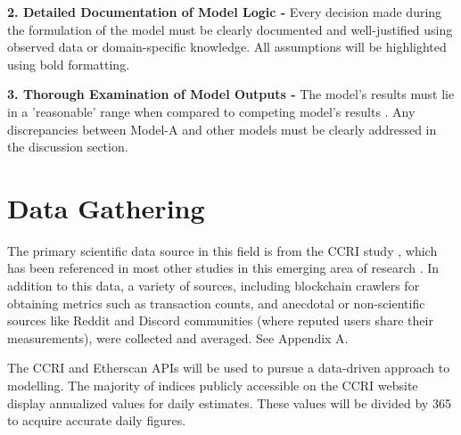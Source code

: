 \textbf{2. Detailed Documentation of Model Logic - }
Every decision made during the formulation of the model must be clearly documented and well-justified using observed data or domain-specific knowledge. All assumptions will be highlighted using bold formatting.


\textbf{3. Thorough Examination of Model Outputs - }
The model's results must lie in a 'reasonable' range when compared to competing model's results \cite{Al-Aomar2015ModelTechniques}. Any discrepancies between Model-A and other models must be clearly addressed in the discussion section.   

\section {Data Gathering}

The primary scientific data source in this field is from the CCRI study \cite{CryptoCarbonRatingsInstitute2022TheNetwork}, which has been referenced in most other studies in this emerging area of research \cite{IbanezTheExpansion}. In addition to this data, a variety of sources, including blockchain crawlers for obtaining metrics such as transaction counts, and anecdotal or non-scientific sources like Reddit and Discord communities (where reputed users share their measurements), were collected and averaged. See Appendix A.

The CCRI \cite{Ccri-apiOverview} and Etherscan \cite{EtherscanProvider} APIs will be used to pursue a data-driven approach to modelling. The majority of indices publicly accessible on the CCRI website display annualized values for daily estimates. These values will be divided by 365 to acquire accurate daily figures.





